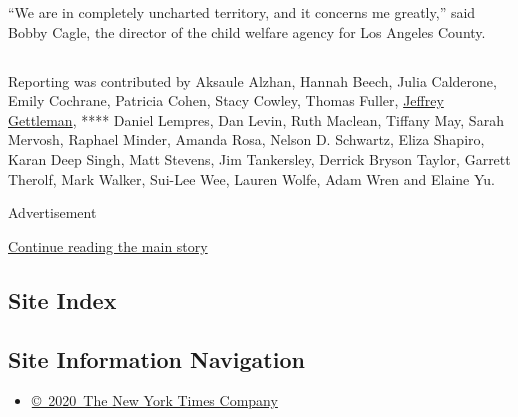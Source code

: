 ``We are in completely uncharted territory, and it concerns me
greatly,'' said Bobby Cagle, the director of the child welfare agency
for Los Angeles County.

\hypertarget{section-9}{%
\subsection{}\label{section-9}}

Reporting was contributed by Aksaule Alzhan, Hannah Beech, Julia
Calderone, Emily Cochrane, Patricia Cohen, Stacy Cowley, Thomas Fuller,
\href{https://www.nytimes3xbfgragh.onion/by/jeffrey-gettleman}{Jeffrey
Gettleman}, **** Daniel Lempres, Dan Levin, Ruth Maclean, Tiffany May,
Sarah Mervosh, Raphael Minder, Amanda Rosa, Nelson D. Schwartz, Eliza
Shapiro, Karan Deep Singh, Matt Stevens, Jim Tankersley, Derrick Bryson
Taylor, Garrett Therolf, Mark Walker, Sui-Lee Wee, Lauren Wolfe, Adam
Wren and Elaine Yu.

Advertisement

\protect\hyperlink{after-bottom}{Continue reading the main story}

\hypertarget{site-index}{%
\subsection{Site Index}\label{site-index}}

\hypertarget{site-information-navigation}{%
\subsection{Site Information
Navigation}\label{site-information-navigation}}

\begin{itemize}
\tightlist
\item
  \href{https://help.nytimes3xbfgragh.onion/hc/en-us/articles/115014792127-Copyright-notice}{©~2020~The
  New York Times Company}
\end{itemize}

